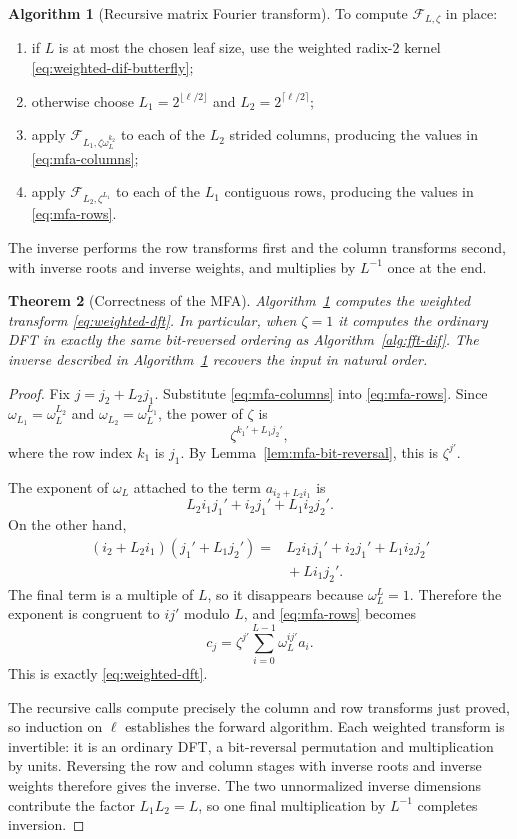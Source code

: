 \documentclass[11pt]{book}
\newtheorem{theorem}{Theorem}[section]
\theoremstyle{definition}
\newtheorem{algorithm}[theorem]{Algorithm}
\begin{document}
\begin{algorithm}[Recursive matrix Fourier transform]\label{alg:mfa-forward}
To compute $\mathcal F_{L,\zeta}$ in place:
\begin{enumerate}
 \item if $L$ is at most the chosen leaf size, use the weighted radix-$2$
 kernel \eqref{eq:weighted-dif-butterfly};
 \item otherwise choose
 $L_1=2^{\lfloor\ell/2\rfloor}$ and
 $L_2=2^{\lceil\ell/2\rceil}$;
 \item apply $\mathcal F_{L_1,\zeta\omega_L^{k_2}}$ to each of the $L_2$
 strided columns, producing the values in \eqref{eq:mfa-columns};
 \item apply $\mathcal F_{L_2,\zeta^{L_1}}$ to each of the $L_1$ contiguous
 rows, producing the values in \eqref{eq:mfa-rows}.
\end{enumerate}
The inverse performs the row transforms first and the column transforms
second, with inverse roots and inverse weights, and multiplies by $L^{-1}$
once at the end.
\end{algorithm}

\begin{theorem}[Correctness of the MFA]\label{thm:mfa}
Algorithm~\ref{alg:mfa-forward} computes the weighted transform
\eqref{eq:weighted-dft}.  In particular, when $\zeta=1$ it computes the
ordinary DFT in exactly the same bit-reversed ordering as
Algorithm~\ref{alg:fft-dif}.  The inverse described in
Algorithm~\ref{alg:mfa-forward} recovers the input in natural order.
\end{theorem}

\begin{proof}
Fix $j=j_2+L_2j_1$.  Substitute \eqref{eq:mfa-columns} into
\eqref{eq:mfa-rows}.  Since
$\omega_{L_1}=\omega_L^{L_2}$ and
$\omega_{L_2}=\omega_L^{L_1}$, the power of $\zeta$ is
\[
 \zeta^{k_1'+L_1j_2'},
\]
where the row index $k_1$ is $j_1$.  By
Lemma~\ref{lem:mfa-bit-reversal}, this is $\zeta^{j'}$.

The exponent of $\omega_L$ attached to the term
$a_{i_2+L_2i_1}$ is
\[
 L_2i_1j_1'+i_2j_1'+L_1i_2j_2'.
\]
On the other hand,
\begin{align*}
 (i_2+L_2i_1)(j_1'+L_1j_2')
  ={}&L_2i_1j_1'+i_2j_1'+L_1i_2j_2'\\
    &{}+Li_1j_2'.
\end{align*}
The final term is a multiple of $L$, so it disappears because
$\omega_L^L=1$.  Therefore the exponent is congruent to $ij'$ modulo $L$,
and \eqref{eq:mfa-rows} becomes
\[
 c_j=\zeta^{j'}\sum_{i=0}^{L-1}\omega_L^{ij'}a_i.
\]
This is exactly \eqref{eq:weighted-dft}.

The recursive calls compute precisely the column and row transforms just
proved, so induction on $\ell$ establishes the forward algorithm.  Each
weighted transform is invertible: it is an ordinary DFT, a bit-reversal
permutation and multiplication by units.  Reversing the row and column
stages with inverse roots and inverse weights therefore gives the inverse.
The two unnormalized inverse dimensions contribute the factor
$L_1L_2=L$, so one final multiplication by $L^{-1}$ completes inversion.
\end{proof}
\end{document}

